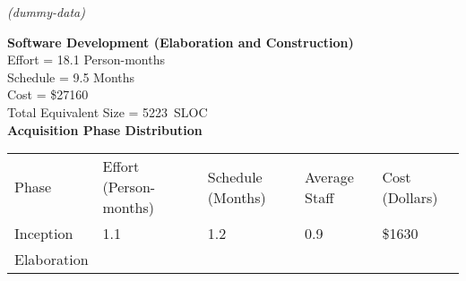 \textit{(dummy-data)}

\textbf{Software Development (Elaboration and
Construction)}\\[2\baselineskip]Effort = 18.1 Person-months\\
Schedule = 9.5 Months\\
Cost = \$27160\\[2\baselineskip]Total Equivalent Size =
5223~SLOC\\[2\baselineskip]\textbf{Acquisition Phase Distribution}\\
{ }

\begin{longtable}[c]{@{}lllll@{}}
\toprule
\begin{minipage}[t]{0.17\columnwidth}\raggedright\strut
Phase
\strut\end{minipage} &
\begin{minipage}[t]{0.17\columnwidth}\raggedright\strut
Effort (Person-months)
\strut\end{minipage} &
\begin{minipage}[t]{0.17\columnwidth}\raggedright\strut
Schedule (Months)
\strut\end{minipage} &
\begin{minipage}[t]{0.17\columnwidth}\raggedright\strut
Average Staff
\strut\end{minipage} &
\begin{minipage}[t]{0.17\columnwidth}\raggedright\strut
Cost (Dollars)
\strut\end{minipage}\tabularnewline
\begin{minipage}[t]{0.17\columnwidth}\raggedright\strut
Inception
\strut\end{minipage} &
\begin{minipage}[t]{0.17\columnwidth}\raggedright\strut
1.1
\strut\end{minipage} &
\begin{minipage}[t]{0.17\columnwidth}\raggedright\strut
1.2
\strut\end{minipage} &
\begin{minipage}[t]{0.17\columnwidth}\raggedright\strut
0.9
\strut\end{minipage} &
\begin{minipage}[t]{0.17\columnwidth}\raggedright\strut
\$1630
\strut\end{minipage}\tabularnewline
\begin{minipage}[t]{0.17\columnwidth}\raggedright\strut
Elaboration
\strut\end{minipage} &
\begin{minipage}[t]{0.17\columnwidth}\raggedright\strut

\end{minipage}
\end{longtable}
